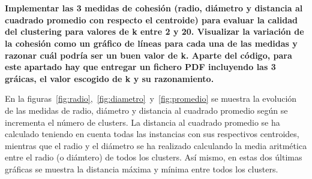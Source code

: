 \documentclass[11pt,a4paper]{article}
\begin{document}
 
\pagestyle{fancy}
\fancyhf{}
\rfoot{\thepage\ / \pageref{LastPage}}
\renewcommand{\headrulewidth}{0.4pt}
\renewcommand{\footrulewidth}{0.4pt}
\section*{}

\textbf{Implementar las 3 medidas de cohesión (radio, diámetro y distancia al
cuadrado promedio con respecto el centroide) para evaluar la calidad del
clustering para valores de k entre 2 y 20. Visualizar la variación de la
cohesión como un gráfico de líneas para cada una de las medidas y razonar
cuál podría ser un buen valor de k. Aparte del código, para este apartado
hay que entregar un fichero PDF incluyendo las 3 gráicas, el valor escogido
de k y su razonamiento.}


En la figuras~\ref{fig:radio},~\ref{fig:diametro}~y~\ref{fig:promedio} se
muestra la evolución de las medidas de radio, diámetro y distancia al
cuadrado promedio según se incrementa el número de clusters. La distancia
al cuadrado promedio se ha calculado teniendo en cuenta todas las
instancias con sus respectivos centroides, mientras que el radio y el
diámetro se ha realizado calculando la media aritmética entre el radio (o
diámtero) de todos los clusters. Así mismo, en estas dos últimas gráficas
se muestra la distancia máxima y mínima entre todos los clusters. 
\end{document}
